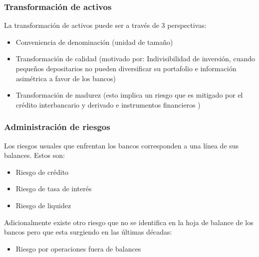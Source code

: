\documentclass[10pt, xcolor=table, x11names]{beamer}
\begin{document}
\begin{frame}
    \frametitle{{\normalsize Transformación de activos} {}}
    La transformación de activos puede ser a través de 3 perspectivas:
    \begin{itemize}
        \item Conveniencia de denominación (unidad de tamaño)
        \item Transformación de calidad (motivado por: Indivisibilidad de inversión, cuando pequeños depositarios no pueden diversificar su portafolio e información asimétrica a favor de los bancos)
        \item Transformación de madurez (esto implica un riesgo que es mitigado por el crédito interbancario y derivado e instrumentos financieros )
     \end{itemize}
\end{frame}
	
    \begin{frame}
        \frametitle{{\normalsize Administración de riesgos} {}}
     Los riesgos usuales que enfrentan los bancos corresponden a una línea de sus balances. Estos son:
     \begin{itemize}
         \item Riesgo de crédito
         \item Riesgo de tasa de interés
         \item Riesgo de liquidez
     \end{itemize}
     Adicionalmente existe otro riesgo que no se identifica en la hoja de balance de los bancos pero que esta surgiendo en las últimas décadas:
     \begin{itemize}
         \item Riesgo por operaciones fuera de balances
     \end{itemize}
\end{frame}
    
\end{document}
